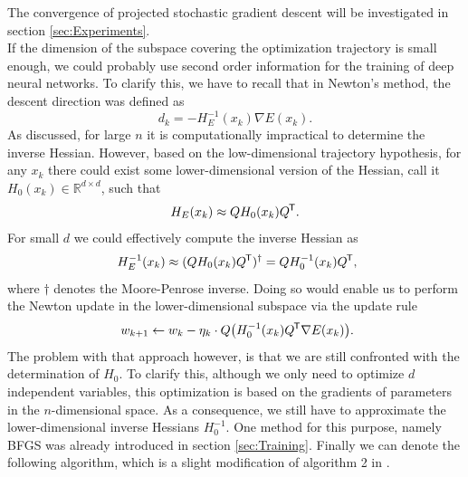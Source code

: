 \documentclass[11pt, a4paper]{article}
\newcommand{\R}{\mathbb{R}}
\newcommand*{\tr}{^{\mkern-1.5mu\mathsf{T}}}
\begin{document}
The convergence of projected stochastic gradient descent will be investigated in section \ref{sec:Experiments}. \\

If the dimension of the subspace covering the optimization trajectory is small enough, we could probably use second order information for the training of deep neural networks. To clarify this, we have to recall that in Newton's method, the descent direction was defined as
\[ d_k = - H_E^{-1}(x_k) \nabla E(x_k). \]
As discussed, for large $n$ it is computationally impractical to determine the inverse Hessian. However, based on the low-dimensional trajectory hypothesis, for any $x_k$ there could exist some lower-dimensional version of the Hessian, call it $H_0(x_k) \in \R^{d \times d}$, such that
\[ H_E(x_k) \approx Q H_0(x_k) Q \tr. \]
For small $d$ we could effectively compute the inverse Hessian as
\[ H_E^{-1}(x_k) \approx ( Q H_0(x_k) Q \tr )^\dagger = Q H_0^{-1}(x_k) Q \tr, \]
where $\dagger$ denotes the Moore-Penrose inverse. Doing so would enable us to perform the Newton update in the lower-dimensional subspace via the update rule
\[ w_{k+1} \leftarrow w_k - \eta_k \cdot Q \big (H_0^{-1}(x_k) Q \tr \nabla E(x_k) \big ). \]
The problem with that approach however, is that we are still confronted with the determination of $H_0$. To clarify this, although we only need to optimize $d$ independent variables, this optimization is based on the gradients of parameters in the $n$-dimensional space. As a consequence, we still have to approximate the lower-dimensional inverse Hessians $H_0^{-1}$. One method for this purpose, namely BFGS was already introduced in section \ref{sec:Training}. Finally we can denote the following algorithm, which is a slight modification of algorithm 2 in \cite{Paper}.
\end{document}
